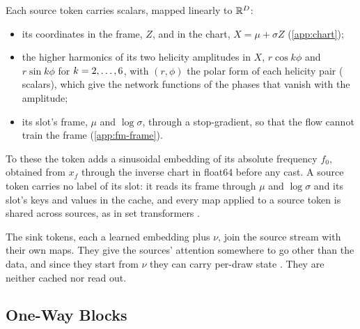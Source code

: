 Each source token carries \NetworkSourceScalars{} scalars, mapped linearly to $\mathbb{R}^D$:
\begin{itemize}
  \item its \NetworkCoordsWord{} coordinates in the frame, $Z$, and in the chart, $X = \mu +
  \sigma Z$ (\cref{app:chart});
  \item the higher harmonics of its two helicity amplitudes in $X$, $r\cos k\phi$ and $r\sin
  k\phi$ for $k=2,\dots,6{}$, with $(r,\phi)$ the polar form of each helicity pair
  (\NetworkHarmonicScalars{} scalars), which give the network functions of the phases that vanish
  with the amplitude;
  \item its slot's frame, $\mu$ and $\log\sigma$, through a stop-gradient, so that the flow cannot
  train the frame (\cref{app:fm-frame}).
\end{itemize}
To these the token adds a sinusoidal embedding of its absolute frequency $f_0$, obtained from $x_f$
through the inverse chart in float64 before any cast. A source token carries no label of its slot:
it reads its frame through $\mu$ and $\log\sigma$ and its slot's keys and values in the cache, and
every map applied to a source token is shared across sources, as in set transformers
\citep{zaheer2017deep,lee2019set}.

The \NetworkSinksWord{} sink tokens, each a learned embedding plus $\nu$, join the source stream
with their own maps. They give the sources' attention somewhere to go other than the data, and since
they start from $\nu$ they can carry per-draw state \citep{xiao2024efficient,darcet2024vision}.
They are neither cached nor read out.

\subsection{One-Way Blocks}
\label{app:network-blocks}

